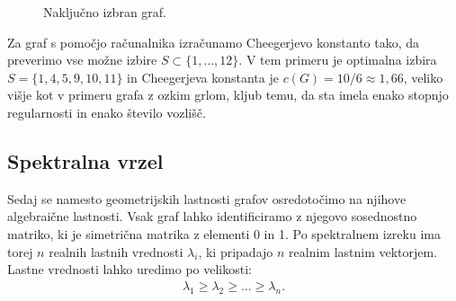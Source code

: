 \begin{primer}
\begin{figure}[t]
        \caption{Naključno izbran graf.}
        \label{fig:nakljucnograf}
    \end{figure}
    Za graf s pomočjo računalnika izračunamo Cheegerjevo konstanto tako, da preverimo vse možne izbire \(S \subset \{1, \ldots, 12\}\). V tem primeru je optimalna izbira \(S = \{1, 4, 5, 9, 10, 11\}\) in Cheegerjeva konstanta je \(c(G) = 10/6 \approx 1{,}66\), veliko višje kot v primeru grafa z ozkim grlom, kljub temu, da sta imela enako stopnjo regularnosti in enako število vozlišč.
\end{primer}
\subsection{Spektralna vrzel}
Sedaj se namesto geometrijskih lastnosti grafov osredotočimo na njihove algebraične lastnosti. Vsak graf lahko identificiramo z njegovo sosednostno matriko, ki je simetrična matrika z elementi 0 in 1. Po spektralnem izreku ima torej \(n\) realnih lastnih vrednosti \(\lambda_i\), ki pripadajo \(n\) realnim lastnim vektorjem. Lastne vrednosti lahko uredimo po velikosti:
\begin{align*}
    \lambda_1 \geq \lambda_2 \geq \ldots \geq \lambda_n.
\end{align*}

